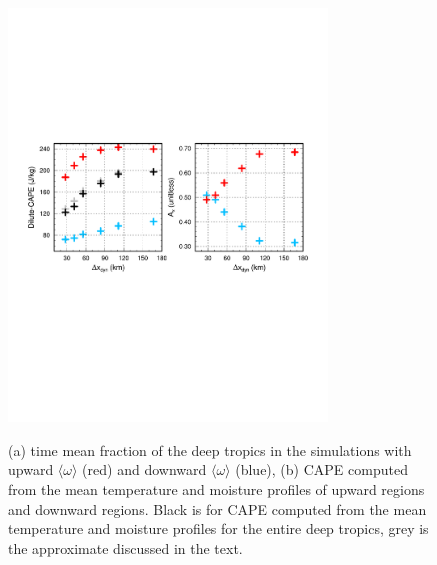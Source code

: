 \documentclass[times]{qjrms4}
\begin{document}
\begin{figure}[t]
\begin{center}
\noindent\includegraphics[width=20pc,angle=0]{figs/temp_cape.pdf}\\
\end{center}
\caption{(a) time mean fraction of the deep tropics in the simulations with upward $\langle \omega \rangle$ (red) and downward $\langle \omega \rangle$ (blue), (b) CAPE computed from the mean temperature and moisture profiles of upward regions and downward regions. Black is for CAPE computed from the mean temperature and moisture profiles for the entire deep tropics, grey is the approximate discussed in the text.}
\label{fig:cape}
\end{figure}
\end{document}
